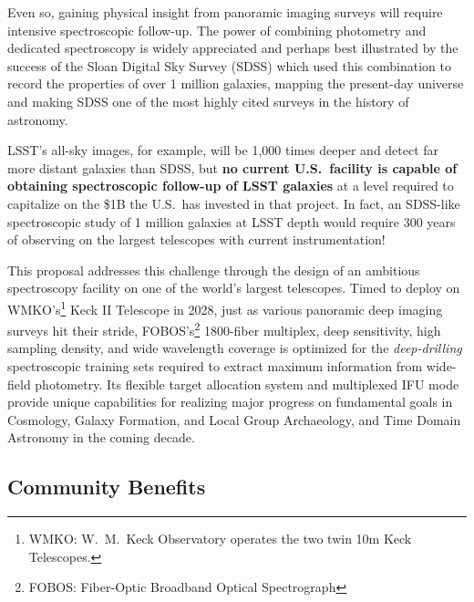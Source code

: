 \documentclass[oneside,11pt]{amsart}
\begin{document}


Even so, gaining physical insight from panoramic imaging surveys will require intensive spectroscopic follow-up.  The
power of combining photometry and dedicated spectroscopy is widely appreciated and perhaps best illustrated by the
success of the Sloan Digital Sky Survey (SDSS) which used this combination to record the properties of over 1 million
galaxies, mapping the present-day universe and making SDSS one of the most highly cited surveys in the history of
astronomy.


LSST's all-sky images, for example, will be 1,000 times deeper and detect far more
distant galaxies than SDSS, but \textbf{no current U.S.~facility is
capable of obtaining spectroscopic follow-up of LSST galaxies} at a level
required to capitalize on the \$1B the U.S.\ has invested in that
project.  In fact, an SDSS-like spectroscopic study of 1 million
galaxies at LSST depth would require 300 years of observing on the
largest telescopes with current instrumentation!  

This proposal addresses this challenge through the design of an ambitious spectroscopy facility on one of the world's largest telescopes.  Timed to deploy on WMKO's\footnote{WMKO: W.~M.\ Keck Observatory operates the two twin 10m Keck Telescopes.} Keck II Telescope in 2028, just as various panoramic deep imaging surveys hit their stride, FOBOS's\footnote{FOBOS: Fiber-Optic Broadband Optical Spectrograph} 1800-fiber multiplex, deep sensitivity, high sampling density, and wide wavelength coverage is optimized for the \emph{deep-drilling} spectroscopic training sets required to extract maximum information from wide-field photometry.  Its flexible target allocation system and multiplexed IFU mode provide unique capabilities for realizing major progress on fundamental goals in Cosmology, Galaxy Formation, and Local Group Archaeology, and Time Domain Astronomy in the coming decade.

\subsection{Community Benefits}
\end{document}
